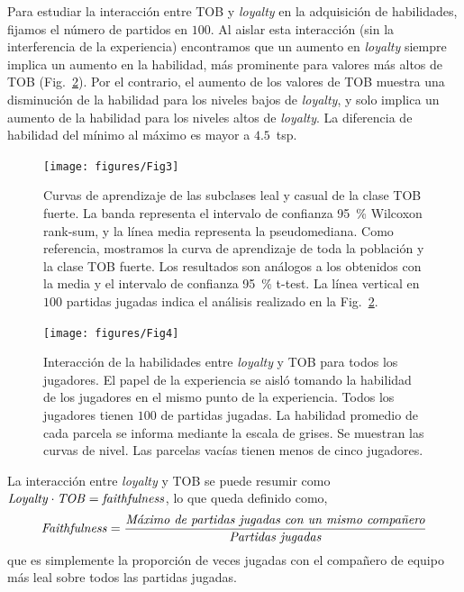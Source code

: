 \documentclass[a4paper,11pt]{book}
\theoremstyle{definition}
\begin{document}
Para estudiar la interacci\'on entre TOB y \emph{loyalty} en la adquisici\'on de habilidades, fijamos el n\'umero de partidos en $100$.
%
Al aislar esta interacci\'on (sin la interferencia de la experiencia) encontramos que un aumento en \emph{loyalty} siempre implica un aumento en la habilidad, m\'as prominente para valores m\'as altos de TOB (Fig.~\ref{skillModels_loyaltyTeamOriented_imageEmpirical}).
%
Por el contrario, el aumento de los valores de TOB muestra una disminuci\'on de la habilidad para los niveles bajos de \emph{loyalty}, y solo implica un aumento de la habilidad para los niveles altos de \emph{loyalty}.
%
La diferencia de habilidad del m\'inimo al m\'aximo es mayor a $4.5$~tsp.

\clearpage
\begin{figure}[ht!]
\centering
\texttt{[image: figures/Fig3]}
\caption{
Curvas de aprendizaje de las subclases leal y casual de la clase TOB fuerte.
%
La banda representa el intervalo de confianza \SI{95}{\percent} Wilcoxon rank-sum, y la l\'inea media representa la pseudomediana.
%
Como referencia, mostramos la curva de aprendizaje de toda la poblaci\'on y la clase TOB fuerte.
%
Los resultados son an\'alogos a los obtenidos con la media y el intervalo de confianza \SI{95}{\percent} t-test.
%
La l\'inea vertical en $100$ partidas jugadas indica el an\'alisis realizado en la Fig.~\protect\ref{skillModels_loyaltyTeamOriented_imageEmpirical}.
}
\label{learningskill_pteam89_ployal}
\end{figure}

\begin{figure}[ht!]
\centering
\texttt{[image: figures/Fig4]}
\caption{
Interacci\'on de la habilidades entre \emph{loyalty} y TOB para todos los jugadores.
%
El papel de la experiencia se aisl\'o tomando la habilidad de los jugadores en el mismo punto de la experiencia.
%
Todos los jugadores tienen $100$ de partidas jugadas.
%
La habilidad promedio de cada parcela se informa mediante la escala de grises.
%
Se muestran las curvas de nivel.
%
Las parcelas vac\'ias tienen menos de cinco jugadores.
}
\label{skillModels_loyaltyTeamOriented_imageEmpirical}
\end{figure}

La interacci\'on entre \emph{loyalty} y TOB se puede resumir como $ \text{\emph{Loyalty}} \cdot \text{\emph{TOB}} = \text{\emph{faithfulness}}$, lo que queda definido como,
%
\begin{equation}
\text{\emph{Faithfulness}} = \frac{\text{\emph{M\'aximo de partidas jugadas con un mismo compa\~nero}}}{\text{\emph{Partidas jugadas}}}
\end{equation}
%
que es simplemente la proporci\'on de veces jugadas con el compa\~nero de equipo m\'as leal sobre todos las partidas jugadas.
\end{document}
